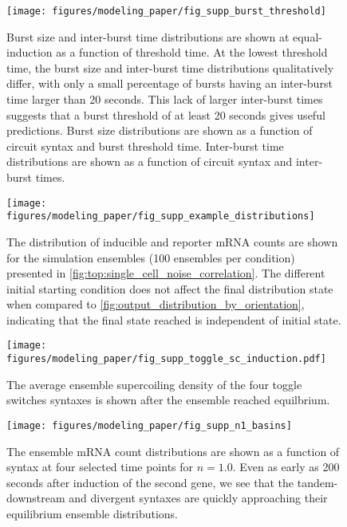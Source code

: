 \documentclass[11pt]{article}
\begin{document}
\begin{figure}[hbtp]
    \centering
    {\texttt{[image: figures/modeling\_paper/fig\_supp\_burst\_threshold]}
    \label{fig:burst_threshold_burst_size}
    \label{fig:burst_threshold_interburst_time}
    }
    \caption{Burst size and inter-burst time distributions are shown at equal-induction as a function of threshold time. At the lowest threshold time, the burst size and inter-burst time distributions qualitatively differ, with only a small percentage of bursts having an inter-burst time larger than 20 seconds. This lack of larger inter-burst times suggests that a burst threshold of at least 20 seconds gives useful predictions. 
         Burst size distributions are shown as a function of circuit syntax and burst threshold time.
         Inter-burst time distributions are shown as a function of circuit syntax and inter-burst times.
    }
    \label{fig:top:burst_threshold}
\end{figure}

\begin{figure}[hbtp]
    \centering
    \texttt{[image: figures/modeling\_paper/fig\_supp\_example\_distributions]}
    \caption{The distribution of inducible and reporter mRNA counts are shown for the simulation ensembles (100 ensembles per condition) presented in \cref{fig:top:single_cell_noise_correlation}. The different initial starting condition does not affect the final distribution state when compared to \cref{fig:output_distribution_by_orientation}, indicating that the final state reached is independent of initial state.}
    \label{fig:supp:fig_examples_ensemble_behavior}
\end{figure}

\begin{figure}[hbtp]
    \centering
    \texttt{[image: figures/modeling\_paper/fig\_supp\_toggle\_sc\_induction.pdf]}
    \caption{The average ensemble supercoiling density of the four toggle switches syntaxes is shown after the ensemble reached equilbrium.}
    \label{fig:supp:toggles_sc_density}
\end{figure}

\begin{figure}[hbtp]
    \centering
    \texttt{[image: figures/modeling\_paper/fig\_supp\_n1\_basins]}
    \caption{The ensemble mRNA count distributions are shown as a function of syntax at four selected time points for \(n = 1.0\). Even as early as 200 seconds after induction of the second gene, we see that the tandem-downstream and divergent syntaxes are quickly approaching their equilibrium ensemble distributions.}
    \label{fig:supp:n1_toggle_distributions}
\end{figure}
\end{document}
